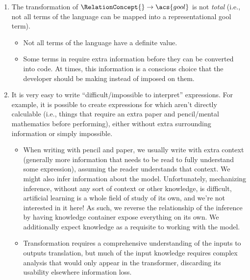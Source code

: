 \begin{enumerate}

	\item The transformation of \(\RelationConcept{} \rightarrow \acs{gool}\) is
	      not \textit{total} (i.e., not all terms of the \Expr{} language can be
	      mapped into a representational \acs{gool} term).

	      \begin{itemize}

		      \item Not all terms of the \Expr{} language have a definite value.

		      \item Some terms in \Expr{} require extra information before they
		            can be converted into code. At times, this information is a
		            conscious choice that the developer should be making instead
		            of imposed on them.

	      \end{itemize}

	\item It is very easy to write ``difficult/impossible to interpret''
	      expressions. For example, it is possible to create expressions for
	      which aren't directly calculable (i.e., things that require an extra
	      paper and pencil/mental mathematics before performing), either without
	      extra surrounding information or simply impossible.

	      \begin{itemize}

		      \item When writing with pencil and paper, we usually write with
		            extra context (generally more information that needs to be
		            read to fully understand some expression), assuming the
		            reader understands that context. We might also infer
		            information about the model. Unfortunately, mechanizing
		            inference, without any sort of context or other knowledge,
		            is difficult, artificial learning is a whole field of study
		            of its own, and we're not interested in it here! As such, we
		            reverse the relationship of the inference by having
		            knowledge container expose everything on its own. We
		            additionally expect knowledge as a requisite to working with
		            the model.

		      \item Transformation requires a comprehensive understanding of the
		            inputs to outputs translation, but much of the input
		            knowledge requires complex analysis that would only appear
		            in the transformer, discarding its usability elsewhere \textemdash{}
		            information loss.


\end{itemize}
\end{enumerate}
